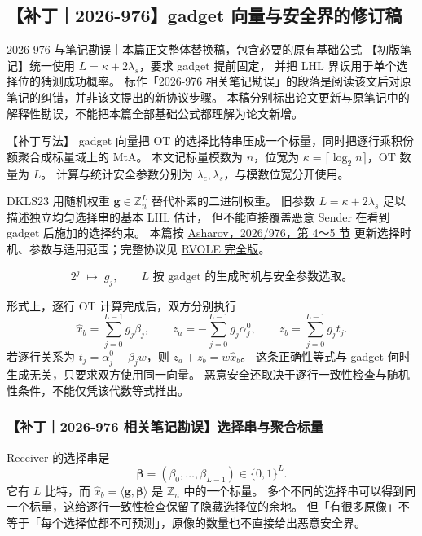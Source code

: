 
\subsection{【补丁｜2026-976】gadget 向量与安全界的修订稿}\label{sec:gadget-vector}

\begin{patchnote}{2026-976 与笔记勘误｜本篇正文整体替换稿，包含必要的原有基础公式}
【初版笔记】统一使用 $L=\kappa+2\lambda_s$，要求 gadget 提前固定，
并把 LHL 界误用于单个选择位的猜测成功概率。
标作「2026-976 相关笔记勘误」的段落是阅读该文后对原笔记的纠错，并非该文提出的新协议步骤。
本稿分别标出论文更新与原笔记中的解释性勘误，不能把本篇全部基础公式都理解为论文新增。

【补丁写法】
gadget 向量把 OT 的选择比特串压成一个标量，同时把逐行乘积份额聚合成标量域上的 MtA。
本文记标量模数为 $n$，位宽为 $\kappa=\lceil\log_2n\rceil$，OT 数量为 $L$。
计算与统计安全参数分别为 $\lambda_c,\lambda_s$，与模数位宽分开使用。

DKLS23 用随机权重 $\boldsymbol g\in\mathbb Z_n^L$ 替代朴素的二进制权重。
旧参数 $L=\kappa+2\lambda_s$ 足以描述独立均匀选择串的基本 LHL 估计，
但不能直接覆盖恶意 Sender 在看到 gadget 后施加的选择约束。
本篇按 \href{https://eprint.iacr.org/2026/976.pdf}{Asharov，2026/976，第 4～5 节}
更新选择时机、参数与适用范围；完整协议见 \hyperref[sec:rvole:parameters-model]{RVOLE 完全版}。

\begin{equation}\label{eq:misc-gadget:1}
2^j\;\longmapsto\;g_j,\qquad
L\text{ 按 gadget 的生成时机与安全参数选取。}
\end{equation}

形式上，逐行 OT 计算完成后，双方分别执行
\begin{equation}\label{eq:misc-gadget:2}
\hat x_b=\sum_{j=0}^{L-1}g_j\beta_j,\qquad
z_a=-\sum_{j=0}^{L-1}g_j\alpha_j^0,\qquad
z_b=\sum_{j=0}^{L-1}g_jt_j.
\end{equation}
若逐行关系为 $t_j=\alpha_j^0+\beta_jw$，则 $z_a+z_b=w\hat x_b$。
这条正确性等式与 gadget 何时生成无关，只要求双方使用同一向量。
恶意安全还取决于逐行一致性检查与随机性条件，不能仅凭该代数等式推出。

\subsubsection{【补丁｜2026-976 相关笔记勘误】选择串与聚合标量}

Receiver 的选择串是
\begin{equation}\label{eq:misc-gadget:4}
\boldsymbol\beta=(\beta_0,\ldots,\beta_{L-1})\in\{0,1\}^L.
\end{equation}
它有 $L$ 比特，而 $\hat x_b=\langle\boldsymbol g,\boldsymbol\beta\rangle$ 是 $\mathbb Z_n$ 中的一个标量。
多个不同的选择串可以得到同一个标量，这给逐行一致性检查保留了隐藏选择位的余地。
但「有很多原像」不等于「每个选择位都不可预测」，原像的数量也不直接给出恶意安全界。


\end{patchnote}
